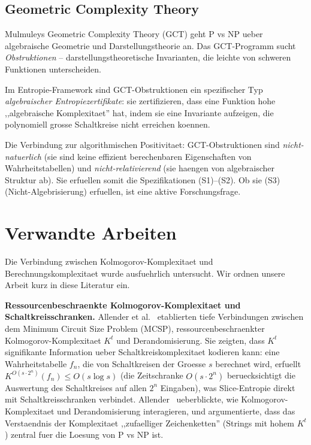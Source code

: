 \documentclass[aps,prd,twocolumn,superscriptaddress,nofootinbib]{revtex4-2}
\theoremstyle{definition}
\theoremstyle{remark}
\newcommand{\NP}{\mathrm{NP}}
\newcommand{\PP}{\mathrm{P}}
\begin{document}
\subsection{Geometric Complexity Theory}

Mulmuleys Geometric Complexity Theory (GCT) \cite{Mulmuley2011} geht $\PP$ vs $\NP$ ueber algebraische Geometrie und Darstellungstheorie an. Das GCT-Programm sucht \textit{Obstruktionen} -- darstellungstheoretische Invarianten, die leichte von schweren Funktionen unterscheiden.

Im Entropie-Framework sind GCT-Obstruktionen ein spezifischer Typ \textit{algebraischer Entropiezertifikate}: sie zertifizieren, dass eine Funktion hohe ,,algebraische Komplexitaet'' hat, indem sie eine Invariante aufzeigen, die polynomiell grosse Schaltkreise nicht erreichen koennen.

Die Verbindung zur algorithmischen Positivitaet: GCT-Obstruktionen sind \textit{nicht-natuerlich} (sie sind keine effizient berechenbaren Eigenschaften von Wahrheitstabellen) und \textit{nicht-relativierend} (sie haengen von algebraischer Struktur ab). Sie erfuellen somit die Spezifikationen (S1)--(S2). Ob sie (S3) (Nicht-Algebrisierung) erfuellen, ist eine aktive Forschungsfrage.


\section{Verwandte Arbeiten}
\label{sec:related}

Die Verbindung zwischen Kolmogorov-Komplexitaet und Berechnungskomplexitaet wurde ausfuehrlich untersucht. Wir ordnen unsere Arbeit kurz in diese Literatur ein.

\textbf{Ressourcenbeschraenkte Kolmogorov-Komplexitaet und Schaltkreisschranken.}
Allender et al.~\cite{Allender2006} etablierten tiefe Verbindungen zwischen dem Minimum Circuit Size Problem (MCSP), ressourcenbeschraenkter Kolmogorov-Komplexitaet $K^t$ und Derandomisierung. Sie zeigten, dass $K^t$ signifikante Information ueber Schaltkreiskomplexitaet kodieren kann: eine Wahrheitstabelle $f_n$, die von Schaltkreisen der Groesse $s$ berechnet wird, erfuellt $K^{O(s \cdot 2^n)}(f_n) \leq O(s \log s)$ (die Zeitschranke $O(s \cdot 2^n)$ beruecksichtigt die Auswertung des Schaltkreises auf allen $2^n$ Eingaben), was Slice-Entropie direkt mit Schaltkreisschranken verbindet. Allender~\cite{Allender2001} ueberblickte, wie Kolmogorov-Komplexitaet und Derandomisierung interagieren, und argumentierte, dass das Verstaendnis der Komplexitaet ,,zufaelliger Zeichenketten'' (Strings mit hohem $K^t$) zentral fuer die Loesung von P vs NP ist.
\end{document}
